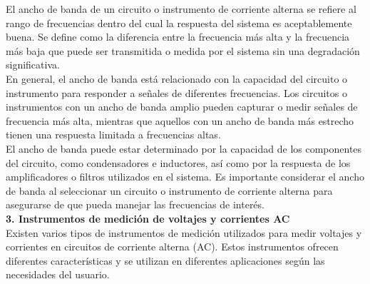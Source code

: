 \documentclass[12pt]{article}
\begin{document}
	El ancho de banda de un circuito o instrumento de corriente alterna se refiere al rango de frecuencias dentro del cual la respuesta del sistema es aceptablemente buena. Se define como la diferencia entre la frecuencia más alta y la frecuencia más baja que puede ser transmitida o medida por el sistema sin una degradación significativa.\\
	
	En general, el ancho de banda está relacionado con la capacidad del circuito o instrumento para responder a señales de diferentes frecuencias. Los circuitos o instrumentos con un ancho de banda amplio pueden capturar o medir señales de frecuencia más alta, mientras que aquellos con un ancho de banda más estrecho tienen una respuesta limitada a frecuencias altas.\\
	
	El ancho de banda puede estar determinado por la capacidad de los componentes del circuito, como condensadores e inductores, así como por la respuesta de los amplificadores o filtros utilizados en el sistema. Es importante considerar el ancho de banda al seleccionar un circuito o instrumento de corriente alterna para asegurarse de que pueda manejar las frecuencias de interés.\\
	
	\textbf{3. Instrumentos de medición de voltajes y corrientes AC}\\
	
	Existen varios tipos de instrumentos de medición utilizados para medir voltajes y corrientes en circuitos de corriente alterna (AC). Estos instrumentos ofrecen diferentes características y se utilizan en diferentes aplicaciones según las necesidades del usuario.
	
\end{document}
